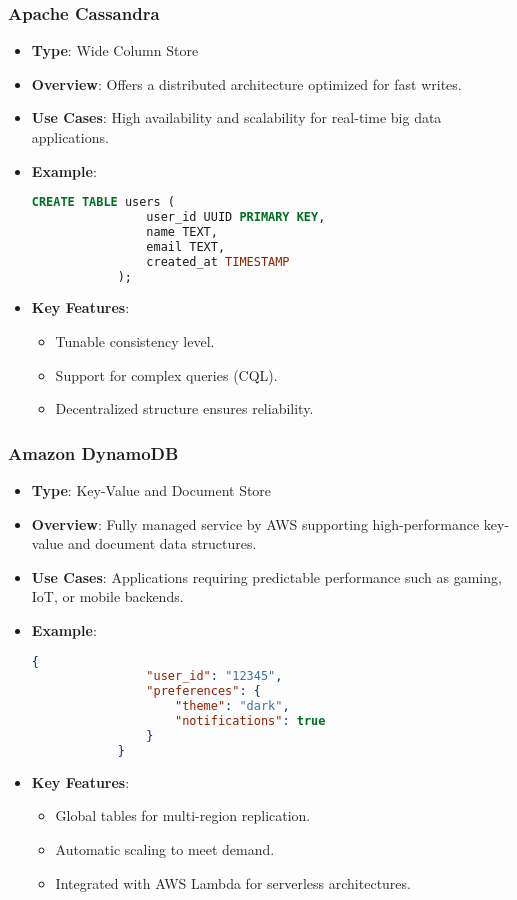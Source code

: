 \documentclass[aspectratio=169]{beamer}
\begin{document}
\begin{frame}[fragile]
    \frametitle{Apache Cassandra}
    \begin{itemize}
        \item \textbf{Type}: Wide Column Store
        \item \textbf{Overview}: Offers a distributed architecture optimized for fast writes.
        \item \textbf{Use Cases}: High availability and scalability for real-time big data applications.
        \item \textbf{Example}:
            \begin{lstlisting}[language=sql]
            CREATE TABLE users (
                user_id UUID PRIMARY KEY,
                name TEXT,
                email TEXT,
                created_at TIMESTAMP
            );
            \end{lstlisting}
        \item \textbf{Key Features}:
            \begin{itemize}
                \item Tunable consistency level.
                \item Support for complex queries (CQL).
                \item Decentralized structure ensures reliability.
            \end{itemize}
    \end{itemize}
\end{frame}

\begin{frame}[fragile]
    \frametitle{Amazon DynamoDB}
    \begin{itemize}
        \item \textbf{Type}: Key-Value and Document Store
        \item \textbf{Overview}: Fully managed service by AWS supporting high-performance key-value and document data structures.
        \item \textbf{Use Cases}: Applications requiring predictable performance such as gaming, IoT, or mobile backends.
        \item \textbf{Example}:
            \begin{lstlisting}[language=json]
            {
                "user_id": "12345",
                "preferences": {
                    "theme": "dark",
                    "notifications": true
                }
            }
            \end{lstlisting}
        \item \textbf{Key Features}:
            \begin{itemize}
                \item Global tables for multi-region replication.
                \item Automatic scaling to meet demand.
                \item Integrated with AWS Lambda for serverless architectures.
            \end{itemize}
    \end{itemize}
\end{frame}
\end{document}
